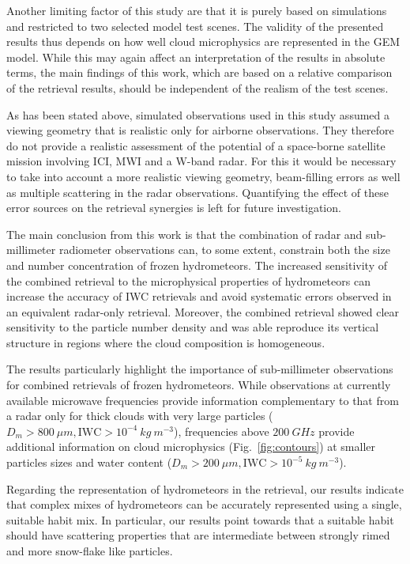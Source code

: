 \documentclass[journal abbreviation, manuscript]{copernicus}
\begin{document}
Another limiting factor of this study are that it is purely based on simulations
and restricted to two selected model test scenes. The validity of the presented
results thus depends on how well cloud microphysics are represented in the GEM
model. While this may again affect an interpretation of the results in absolute
terms, the main findings of this work, which are based on a relative comparison
of the retrieval results, should be independent of the realism of the test
scenes.

As has been stated above, simulated observations used in this study assumed a
viewing geometry that is realistic only for airborne observations. They
therefore do not provide a realistic assessment of the potential of a
space-borne satellite mission involving ICI, MWI and a W-band radar. For this it
would be necessary to take into account a more realistic viewing geometry,
beam-filling errors as well as multiple scattering in the radar observations.
Quantifying the effect of these error sources on the retrieval synergies is
left for future investigation.

\conclusions  %
\label{sec:conclusions}

The main conclusion from this work is that the combination of radar and
sub-millimeter radiometer observations can, to some extent, constrain both the
size and number concentration of frozen hydrometeors. The increased sensitivity
of the combined retrieval to the microphysical properties of hydrometeors can
increase the accuracy of IWC retrievals and avoid systematic errors observed in
an equivalent radar-only retrieval. Moreover, the combined retrieval showed clear
sensitivity to the particle number density and was able reproduce its vertical
structure in regions where the cloud composition is homogeneous.

The results particularly highlight the importance of sub-millimeter observations
for combined retrievals of frozen hydrometeors. While observations at currently
available microwave frequencies provide information complementary to that from a
radar only for thick clouds with very large particles ($D_m > 800\ \unit{\mu m},
\text{IWC} > 10^{-4}\ \unit{kg\ m^{-3}}$), frequencies above $200\ \unit{GHz}$
provide additional information on cloud microphysics (Fig.~\ref{fig:contours})
at smaller particles sizes and water content ($D_m > 200\ \unit{\mu m},
\text{IWC} > 10^{-5}\ \unit{kg\ m^{-3}}$).

Regarding the representation of hydrometeors in the retrieval, our results
indicate that complex mixes of hydrometeors can be accurately represented
using a single, suitable habit mix. In particular, our results point towards that
a suitable habit should have scattering properties that are intermediate
between strongly rimed and  more snow-flake like particles.
\end{document}
